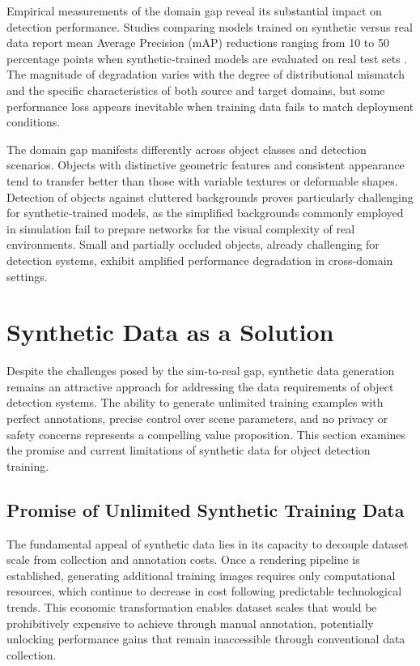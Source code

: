 Empirical measurements of the domain gap reveal its substantial impact on detection performance. Studies comparing models trained on synthetic versus real data report mean Average Precision (mAP) reductions ranging from 10 to 50 percentage points when synthetic-trained models are evaluated on real test sets \cite{tremblay2018training}. The magnitude of degradation varies with the degree of distributional mismatch and the specific characteristics of both source and target domains, but some performance loss appears inevitable when training data fails to match deployment conditions.

The domain gap manifests differently across object classes and detection scenarios. Objects with distinctive geometric features and consistent appearance tend to transfer better than those with variable textures or deformable shapes. Detection of objects against cluttered backgrounds proves particularly challenging for synthetic-trained models, as the simplified backgrounds commonly employed in simulation fail to prepare networks for the visual complexity of real environments. Small and partially occluded objects, already challenging for detection systems, exhibit amplified performance degradation in cross-domain settings.

\section{Synthetic Data as a Solution}
\label{sec:synthetic_data_solution}

Despite the challenges posed by the sim-to-real gap, synthetic data generation remains an attractive approach for addressing the data requirements of object detection systems. The ability to generate unlimited training examples with perfect annotations, precise control over scene parameters, and no privacy or safety concerns represents a compelling value proposition. This section examines the promise and current limitations of synthetic data for object detection training.

\subsection{Promise of Unlimited Synthetic Training Data}
\label{subsec:unlimited_data}

The fundamental appeal of synthetic data lies in its capacity to decouple dataset scale from collection and annotation costs. Once a rendering pipeline is established, generating additional training images requires only computational resources, which continue to decrease in cost following predictable technological trends. This economic transformation enables dataset scales that would be prohibitively expensive to achieve through manual annotation, potentially unlocking performance gains that remain inaccessible through conventional data collection.


